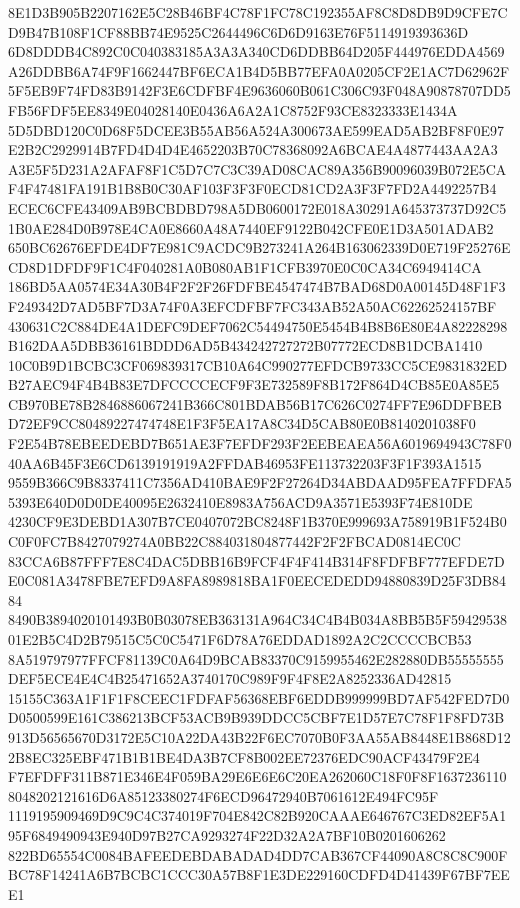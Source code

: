 \documentclass[UTF8,fontset=fandol,zihao=-4,a4paper]{ctexart}
\begin{document}
{{8E1D3B905B2207162E5C28B46BF4C78F1FC78C192355AF8C8D8DB9D9CFE7CD9B47B108F1CF88BB74E9525C2644496C6D6D9163E76F5114919393636D
6D8DDDB4C892C0C040383185A3A3A340CD6DDBB64D205F444976EDDA4569A26DDBB6A74F9F1662447BF6ECA1B4D5BB77EFA0A0205CF2E1AC7D62962F
5F5EB9F74FD83B9142F3E6CDFBF4E9636060B061C306C93F048A90878707DD5FB56FDF5EE8349E04028140E0436A6A2A1C8752F93CE8323333E1434A
5D5DBD120C0D68F5DCEE3B55AB56A524A300673AE599EAD5AB2BF8F0E97E2B2C2929914B7FD4D4D4E4652203B70C78368092A6BCAE4A4877443AA2A3
A3E5F5D231A2AFAF8F1C5D7C7C3C39AD08CAC89A356B90096039B072E5CAF4F47481FA191B1B8B0C30AF103F3F3F0ECD81CD2A3F3F7FD2A4492257B4
ECEC6CFE43409AB9BCBDBD798A5DB0600172E018A30291A645373737D92C51B0AE284D0B978E4CA0E8660A48A7440EF9122B042CFE0E1D3A501ADAB2
650BC62676EFDE4DF7E981C9ACDC9B273241A264B163062339D0E719F25276ECD8D1DFDF9F1C4F040281A0B080AB1F1CFB3970E0C0CA34C6949414CA
186BD5AA0574E34A30B4F2F2F26FDFBE4547474B7BAD68D0A00145D48F1F3F249342D7AD5BF7D3A74F0A3EFCDFBF7FC343AB52A50AC62262524157BF
430631C2C884DE4A1DEFC9DEF7062C54494750E5454B4B8B6E80E4A82228298B162DAA5DBB36161BDDD6AD5B434242727272B07772ECD8B1DCBA1410
10C0B9D1BCBC3CF069839317CB10A64C990277EFDCB9733CC5CE9831832EDB27AEC94F4B4B83E7DFCCCCECF9F3E732589F8B172F864D4CB85E0A85E5
CB970BE78B2846886067241B366C801BDAB56B17C626C0274FF7E96DDFBEBD72EF9CC80489227474748E1F3F5EA17A8C34D5CAB80E0B8140201038F0
F2E54B78EBEEDEBD7B651AE3F7EFDF293F2EEBEAEA56A6019694943C78F040AA6B45F3E6CD6139191919A2FFDAB46953FE113732203F3F1F393A1515
9559B366C9B8337411C7356AD410BAE9F2F27264D34ABDAAD95FEA7FFDFA55393E640D0D0DE40095E2632410E8983A756ACD9A3571E5393F74E810DE
4230CF9E3DEBD1A307B7CE0407072BC8248F1B370E999693A758919B1F524B0C0F0FC7B8427079274A0BB22C884031804877442F2F2FBCAD0814EC0C
83CCA6B87FFF7E8C4DAC5DBB16B9FCF4F4F414B314F8FDFBF777EFDE7DE0C081A3478FBE7EFD9A8FA8989818BA1F0EECEDEDD94880839D25F3DB8484
8490B3894020101493B0B03078EB363131A964C34C4B4B034A8BB5B5F5942953801E2B5C4D2B79515C5C0C5471F6D78A76EDDAD1892A2C2CCCCBCB53
8A519797977FFCF81139C0A64D9BCAB83370C9159955462E282880DB55555555DEF5ECE4E4C4B25471652A3740170C989F9F4F8E2A8252336AD42815
15155C363A1F1F1F8CEEC1FDFAF56368EBF6EDDB999999BD7AF542FED7D0D0500599E161C386213BCF53ACB9B939DDCC5CBF7E1D57E7C78F1F8FD73B
913D56565670D3172E5C10A22DA43B22F6EC7070B0F3AA55AB8448E1B868D122B8EC325EBF471B1B1BE4DA3B7CF8B002EE72376EDC90ACF43479F2E4
F7EFDFF311B871E346E4F059BA29E6E6E6C20EA262060C18F0F8F16372361108048202121616D6A85123380274F6ECD96472940B7061612E494FC95F
1119195909469D9C9C4C374019F704E842C82B920CAAAE646767C3ED82EF5A195F6849490943E940D97B27CA9293274F22D32A2A7BF10B0201606262
822BD65554C0084BAFEEDEBDABADAD4DD7CAB367CF44090A8C8C8C900FBC78F14241A6B7BCBC1CCC30A57B8F1E3DE229160CDFD4D41439F67BF7EEE1
}}
\end{document}
